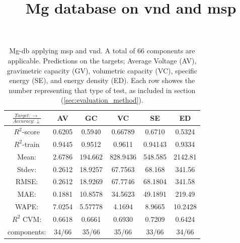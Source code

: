 \begin{table}[h]
\normalsize
\centering
\caption{Mg-db applying msp and vnd. A total of 66 components are applicable. Predictions on the targets; Average Voltage (AV), gravimetric capacity (GV), volumetric capacity (VC), specific energy (SE), and energy density (ED). Each row showes the number representing that type of test, as included in section (\ref{sec:evaluation_method}).}
\title{Mg database on vnd and msp}
\begin{tabular}{|c|c|c|c|c|c|}
	\hline 
	$\frac{Target: \rightarrow}{Accuracy:\downarrow} $ & AV & GC & VC & SE & ED 
	 \\ 
	\hline
	$R^2$-score 	& 0.6205 & 0.5940 & 0.66789 & 0.6710 &  0.5324\\ 
	\hline 
	$R^2$-train 	& 0.9445 & 0.9512 & 0.9611 & 0.94143 &  0.9334 \\ 
	\hline
	Mean: 	 	& 2.6786	&194.662&828.9436& 548.585& 2142.81\\
	\hline 
	Stdev:	 	& 0.2612	&18.9257	&67.7563 	&68.168	& 341.56\\
	\hline 
	RMSE: 		&0.2612& 18.9269 &  67.7746 & 68.1804 &341.58\\ 
	\hline
	MAE: 		& 0.1881 & 10.8578& 34.5623 & 49.1891 & 219.49 \\ 
	\hline
	WAPE: 		& 7.0254 & 5.57778 & 4.1694  & 8.9665 & 10.2428 \\
	\hline
	$R^2$ CVM: 	& 0.6618 	& 0.6661 	& 0.6930	& 0.7209&0.6424 \\
	\hline
	components: 	& 34/66 	& 35/66 	& 35/66 	 & 33/66 	&34/66 \\
	\hline
\end{tabular}
\label{tab:mg-vnd-msp}
\end{table}

